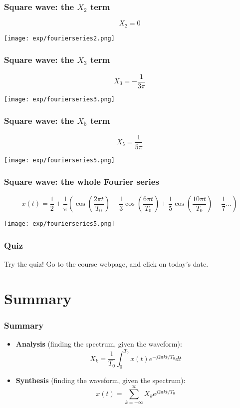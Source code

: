\documentclass{beamer}
\begin{document}
\begin{frame}
  \frametitle{Square wave: the $X_2$ term}
    \[
    X_2 = 0
    \]
  \centerline{\texttt{[image: exp/fourierseries2.png]}}
\end{frame}

\begin{frame}
  \frametitle{Square wave: the $X_3$ term}
    \[
    X_3 = -\frac{1}{3\pi}
    \]
  \centerline{\texttt{[image: exp/fourierseries3.png]}}
\end{frame}

\begin{frame}
  \frametitle{Square wave: the $X_5$ term}
    \[
    X_5 = \frac{1}{5\pi}
    \]
  \centerline{\texttt{[image: exp/fourierseries5.png]}}
\end{frame}

\begin{frame}
  \frametitle{Square wave: the whole Fourier series}
    \[
    x(t) = \frac{1}{2} + \frac{1}{\pi}\left(\cos\left(\frac{2\pi t}{T_0}\right)-\frac{1}{3}\cos\left(\frac{6\pi t}{T_0}\right)+\frac{1}{5}\cos\left(\frac{10\pi t}{T_0}\right)-\frac{1}{7}\ldots\right)
    \]
  \centerline{\texttt{[image: exp/fourierseries5.png]}}
\end{frame}

\begin{frame}
  \frametitle{Quiz}

  Try the quiz!  Go to the course webpage, and click on today's date.
\end{frame}

\section[Summary]{Summary}
\setcounter{subsection}{1}

\begin{frame}
  \frametitle{Summary}
  \begin{itemize}
  \item {\bf Analysis}  (finding the spectrum, given the waveform):
    \[
    X_k = \frac{1}{T_0}\int_0^{T_0} x(t)e^{-j2\pi kt/T_0}dt
    \]
  \item {\bf Synthesis}  (finding the waveform, given the spectrum):
    \[
    x(t) = \sum_{k=-\infty}^\infty X_k e^{j2\pi kt/T_0}
    \]
  \end{itemize}
\end{frame}  
        
\end{document}
